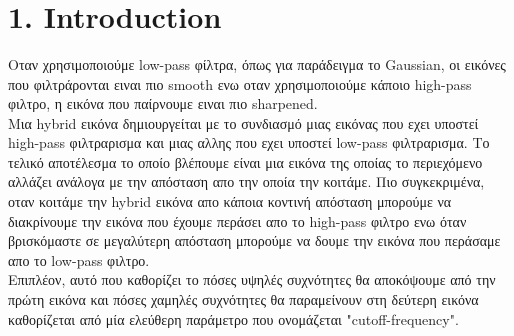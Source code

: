 \documentclass{article}
\newcommand{\tl}[1]{\textlatin{#1}}
\begin{document}
\begin{titlepage}
		\begin{minipage}{0.6\textwidth}
			
			\begin{flushright} \large
				\theauthor\\
				
			\end{flushright}
			
			\begin{flushright} \large
				\tl{\thedate}\\
				
			\end{flushright}
			
		\end{minipage}\\[2 cm]
		
	\end{titlepage}
	
	\newpage
	\section*{1. \tl{Introduction}}
	Οταν χρησιμοποιούμε \tl{low-pass} φίλτρα, όπως για παράδειγμα το \tl{Gaussian}, οι εικόνες που φιλτράρονται ειναι πιο \tl{smooth} ενω οταν χρησιμοποιούμε κάποιο \tl{high-pass} φιλτρο, η εικόνα που παίρνουμε ειναι πιο \tl{sharpened}.\\
	
	\noindent
	Μια \tl{hybrid} εικόνα δημιουργείται με το συνδιασμό μιας εικόνας που εχει υποστεί \tl{high-pass} φιλτραρισμα και μιας αλλης που εχει υποστεί \tl{low-pass} φιλτραρισμα. Το τελικό αποτέλεσμα το οποίο βλέπουμε είναι μια εικόνα της οποίας το περιεχόμενο αλλάζει ανάλογα με την απόσταση απο την οποία την κοιτάμε. Πιο συγκεκριμένα, οταν κοιτάμε την \tl{hybrid} εικόνα απο κάποια κοντινή απόσταση μπορούμε να διακρίνουμε την εικόνα που έχουμε περάσει απο το \tl{high-pass} φιλτρο ενω όταν βρισκόμαστε σε μεγαλύτερη απόσταση μπορούμε να δουμε την εικόνα που περάσαμε απο το \tl{low-pass} φιλτρο.\\
	
	\noindent
	Επιπλέον, αυτό που καθορίζει το πόσες υψηλές συχνότητες θα αποκόψουμε από την πρώτη εικόνα και πόσες χαμηλές συχνότητες θα παραμείνουν στη δεύτερη εικόνα καθορίζεται από μία ελεύθερη παράμετρο που ονομάζεται \tl{"cutoff-frequency"}.
	
\end{document}
